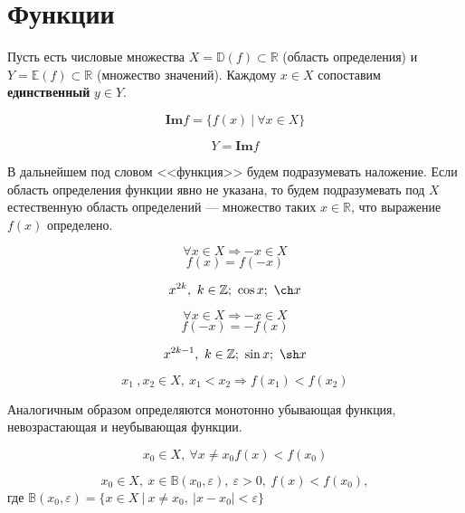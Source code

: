 \section{Функции}
\begin{definition}[Функция]
Пусть есть числовые множества $X=\mathbb{D}(f) \subset \mathbb{R}$ 
(область определения) и $Y=\mathbb{E}(f) \subset \mathbb{R}$ (множество
значений). Каждому $x\in X$ сопоставим \textbf{единственный} $y\in Y$.
\end{definition}
\begin{definition}
$$\mathbf{Im} f = \{ f (x)~|~\forall x \in X \}$$
\end{definition}
\begin{definition}
$$Y=\mathbf{Im} f$$
\end{definition}
В дальнейшем под словом <<функция>> будем подразумевать наложение. Если область определения
функции явно не указана, то будем подразумевать под $X$ естественную область определений ---
множество таких $x \in \mathbb {R}$, что выражение $f(x)$ определено.
\begin{definition}
$$\forall x \in X \Rightarrow -x \in X $$
$$f(x) = f(-x)$$
\end{definition}
\begin{example}
$$x^{2k},~k\in \mathbb{Z};~\cos x;~\ch x $$
\end{example}
\begin{definition}
$$\forall x \in X \Rightarrow -x \in X $$
$$f(-x) = -f(x)$$
\end{definition}
\begin{example}
$$x^{2k-1},~k\in\mathbb{Z};~\sin x;~\sh x $$
\end{example}
\begin{definition}
$$x_1~,x_2 \in X,~x_1 < x_2 \Rightarrow f(x_1) < f(x_2)$$
\end{definition}
Аналогичным образом определяются монотонно  убывающая функция, невозрастающая и неубывающая функции.
\begin{definition}
$$x_0 \in X,~\forall x \ne x_0 f(x) < f(x_0)$$
\end{definition}
\begin{definition}
$$x_0 \in X,~x\in \mathbb{B} (x_0,\varepsilon),~\varepsilon > 0,~ f(x) < f(x_0),$$
где $\mathbb{B}(x_0,\varepsilon) = \{x \in X~|~x \ne x_0,~|x-x_0|<\varepsilon\}$
\end{definition}
